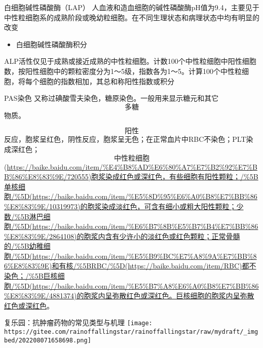 \documentclass[
  ignorenonframetext,
]{beamer}
\providecommand{\tightlist}{%
  \setlength{\itemsep}{0pt}\setlength{\parskip}{0pt}}
\begin{document}
\begin{frame}
\begin{block}{白细胞碱性磷酸酶（LAP）}
\protect\hypertarget{ux767dux7ec6ux80deux78b1ux6027ux78f7ux9178ux9176lap}{}
人血液和造血细胞的碱性磷酸酶pH值为9.4，主要见于中性粒细胞系的成熟阶段或晚幼粒细胞。在不同生理状态和病理状态中均有明显的改变

\begin{itemize}
\tightlist
\item
  白细胞碱性磷酸酶积分
\end{itemize}

ALP活性仅见于成熟或接近成熟的中性粒细胞。计数100个中性粒细胞中阳性细胞数，按阳性细胞中的颗粒密度分为1～5级，指数各为1～5。计算100个中性粒细胞，将每个细胞的指数相加，其总和称阳性指数或积分
\end{block}
\end{frame}

\begin{frame}
\begin{block}{PAS染色}
\protect\hypertarget{pasux67d3ux8272}{}
又称过碘酸雪夫染色，糖原染色。一般用来显示糖元和其它\[多糖\]物质。

\[阳性\]反应，胞浆呈红色，阴性反应，胞浆呈无色；在正常血片中RBC不染色；PLT染成深红色；\[中性粒细胞\](\url{https://baike.baidu.com/item/\%E4\%B8\%AD\%E6\%80\%A7\%E7\%B2\%92\%E7\%BB\%86\%E8\%83\%9E/720555)胞浆染成红色或深红色，有些细胞有阳性颗粒；/\%5B单核细胞/\%5D(https://baike.baidu.com/item/\%E5\%8D\%95\%E6\%A0\%B8\%E7\%BB\%86\%E8\%83\%9E/10319973)的胞浆染成淡红色，可含有细小或粗大阳性颗粒；少数/\%5B淋巴细胞/\%5D(https://baike.baidu.com/item/\%E6\%B7\%8B\%E5\%B7\%B4\%E7\%BB\%86\%E8\%83\%9E/2864108)的胞浆内含有少许小的淡红色或红色颗粒；正常骨髓的/\%5B幼稚细胞/\%5D(https://baike.baidu.com/item/\%E5\%B9\%BC\%E7\%A8\%9A\%E7\%BB\%86\%E8\%83\%9E)和有核/\%5BRBC/\%5D(https://baike.baidu.com/item/RBC)都不染色；/\%5B巨核细胞/\%5D(https://baike.baidu.com/item/\%E5\%B7\%A8\%E6\%A0\%B8\%E7\%BB\%86\%E8\%83\%9E/4881374)的胞浆内呈弥散红色或深红色。巨核细胞的胞浆内呈弥散红色或深红色}。
\end{block}
\end{frame}

\begin{frame}{复乐园：抗肿瘤药物的常见类型与机理}
\protect\hypertarget{ux590dux4e50ux56edux6297ux80bfux7624ux836fux7269ux7684ux5e38ux89c1ux7c7bux578bux4e0eux673aux7406}{}
\texttt{[image: https://gitee.com/rainoffallingstar/rainoffallingstar/raw/mydraft/\_imgbed/202208071658698.png]}
\end{frame}
\end{document}
